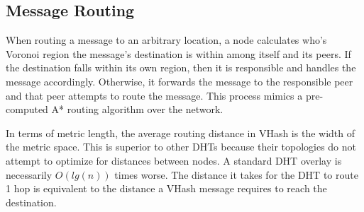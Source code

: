 \documentclass[11pt]{IEEETran} %
\begin{document}
\subsection{Message Routing}

When routing a message to an arbitrary location, a node calculates who's Voronoi region the message's destination is within among itself and its peers. If the destination falls within its own region, then it is responsible and handles the message accordingly. Otherwise, it forwards the message to the responsible peer and that peer attempts to route the message. This process mimics a pre-computed A* \cite{astar} routing algorithm over the network. 

In terms of metric length, the average routing distance in VHash is the width of the metric space. This is superior to other DHTs because their topologies do not attempt to optimize for distances between nodes. A standard DHT overlay is necessarily $O(lg(n))$ times worse. The distance it takes for the DHT to route 1 hop is equivalent to the distance a VHash message requires to reach the destination. 



\end{document}
